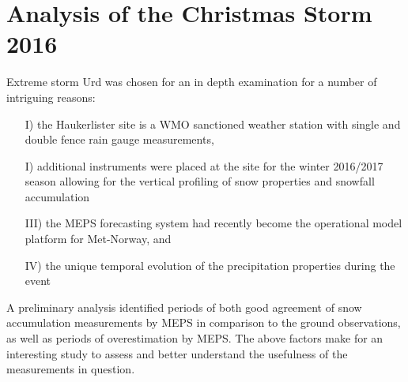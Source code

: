 \chapter{Analysis of the Christmas Storm 2016}\label{ch:weather_ana}
Extreme storm Urd was chosen for an in depth examination for a number of intriguing reasons:  
\begin{itemize}
\item[I)] the Haukerlister site is a WMO sanctioned weather station with single and double fence rain gauge measurements,
\item[I)] additional instruments were placed at the site for the winter 2016/2017 season allowing for the vertical profiling of snow properties and snowfall accumulation
\item[III)] the MEPS forecasting system had recently become the operational model platform for Met-Norway, and
\item[IV)] the unique temporal evolution of the precipitation properties during the event
\end{itemize}
A preliminary analysis identified periods of both good agreement of snow accumulation measurements by MEPS in comparison to the ground observations, as well as periods of overestimation by MEPS. The above factors make for an interesting study to assess and better understand the usefulness of the measurements in question.
